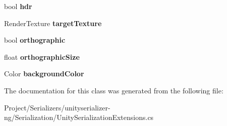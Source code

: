 \begin{DoxyCompactItemize}
bool {\bfseries hdr}
\item 
\mbox{\label{class_serialize_camera_1_1_camera_data_a548c707699a0015c646fe245ae046122}} 
Render\+Texture {\bfseries target\+Texture}
\item 
\mbox{\label{class_serialize_camera_1_1_camera_data_a1a0ff5e10ef8c24a8e6bbe7962ab8e6b}} 
bool {\bfseries orthographic}
\item 
\mbox{\label{class_serialize_camera_1_1_camera_data_a107afdda2d3d25ac4034c7c64a7bb1f4}} 
float {\bfseries orthographic\+Size}
\item 
\mbox{\label{class_serialize_camera_1_1_camera_data_ae1e1fae64d7cb9fd321261cfcd1b1acf}} 
Color {\bfseries background\+Color}
\end{DoxyCompactItemize}


The documentation for this class was generated from the following file\+:\begin{DoxyCompactItemize}
\item 
Project/\+Serializers/unityserializer-\/ng/\+Serialization/Unity\+Serialization\+Extensions.\+cs\end{DoxyCompactItemize}
